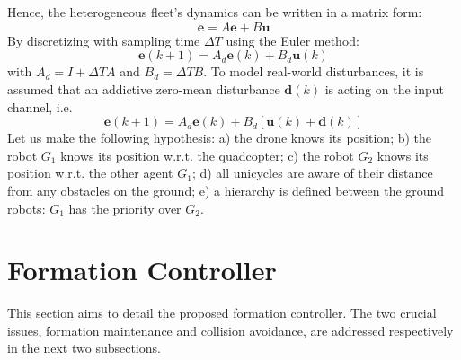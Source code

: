\documentclass{ifacconf}
\begin{document}
Hence, the heterogeneous fleet's dynamics can be written in a matrix form:
\begin{equation}
    \dot{\boldsymbol{e}} = A \boldsymbol{e} + B \boldsymbol{u}
\end{equation}
By discretizing with sampling time $\Delta T$ using the Euler method:
\begin{equation}
    \boldsymbol{e}(k+1) = A_d \boldsymbol{e}(k) + B_d \boldsymbol{u}(k) 
    \label{eq:airground-fleet-z}
\end{equation}
with $A_d = I + \Delta T A $ and $B_d = \Delta T B$.
To model real-world disturbances, it is assumed 
that an addictive zero-mean disturbance $\boldsymbol{d}(k)$
is acting on the input channel, i.e.
\begin{equation}
    \boldsymbol{e}(k+1) = A_d \boldsymbol{e}(k) + B_d \left[\boldsymbol{u}(k) + \boldsymbol{d}(k)\right]
    \label{eq:airground-fleet-z}
\end{equation}
Let us make the following hypothesis: 
a) the drone knows its position;
b) the robot $G_1$ knows its position w.r.t. the quadcopter;
c) the robot $G_2$ knows its position w.r.t. the other agent $G_1$;
d) all unicycles are aware of their distance from any obstacles on the ground;
e) a hierarchy is defined between the ground robots: $G_1$ has the priority over $G_2$.
\section{Formation Controller}
\label{sec:formation_controller}

This section aims to detail the proposed formation controller.
The two crucial issues, formation maintenance and collision avoidance, 
are addressed respectively in the next two subsections.
\end{document}
